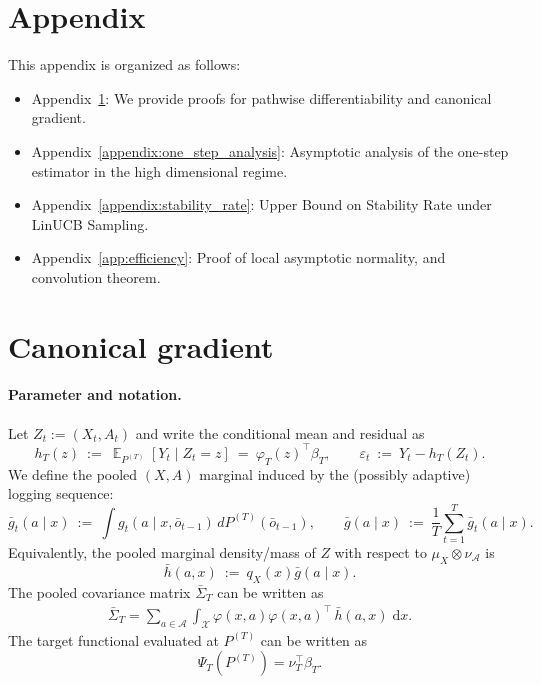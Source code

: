 \documentclass[11pt]{article}
\DeclareMathOperator{\E}{\mathbb{E}}
\begin{document}
\newpage


   

\newpage
\section*{Appendix}
This appendix is organized as follows: 

\begin{itemize}[nosep, label={--}]
    \item Appendix~\ref{app:canonical_gradient}: We provide proofs for pathwise differentiability and canonical gradient. 
    \item Appendix~\ref{appendix:one_step_analysis}: Asymptotic analysis of the one-step estimator in the high dimensional regime.
    \item Appendix~\ref{appendix:stability_rate}: Upper Bound on Stability Rate under LinUCB Sampling. 
    \item Appendix~\ref{app:efficiency}: Proof of local asymptotic normality, and convolution theorem. 
\end{itemize}

\section{Canonical gradient}
\label{app:canonical_gradient}


\paragraph{Parameter and notation.}
Let $Z_t := (X_t,A_t)$ and write the conditional mean and residual as
\[
h_T(z)\ :=\ \E_{P^{(T)}}[Y_t\mid Z_t=z]\ =\ \varphi_T(z)^\top \beta_T,
\qquad
\varepsilon_t\ :=\ Y_t-h_T(Z_t). 
\]
We define the pooled $(X,A)$ marginal induced by the (possibly adaptive) logging sequence:
\[
\bar g_t(a\mid x)\ :=\ \int g_t(a\mid x,\bar o_{t-1})\,dP^{(T)}(\bar o_{t-1}),
\qquad
\bar g(a\mid x)\ :=\ \frac{1}{T}\sum_{t=1}^T \bar g_t(a\mid x).
\]
Equivalently, the pooled marginal density/mass of $Z$ with respect to $\mu_X\otimes \nu_{\mathcal A}$ is
\[
\bar h(a,x)\ :=\ q_X(x)\bar g(a\mid x).
\]
The pooled covariance matrix $\bar{\Sigma}_T$ can be written as 
\begin{align*}
    \bar{\Sigma}_T = \sum_{a\in \mathcal{A}}\int_{\mathcal{X}}\varphi(x,a)\varphi(x,a)^{\top}\,\bar{h}(a,x)\;\mathrm{d}x. 
\end{align*}
The target functional evaluated at $P^{(T)}$ can be written as
\[
\Psi_T(P^{(T)}) = \nu_T^{\top} \beta_T.
\]
\end{document}

